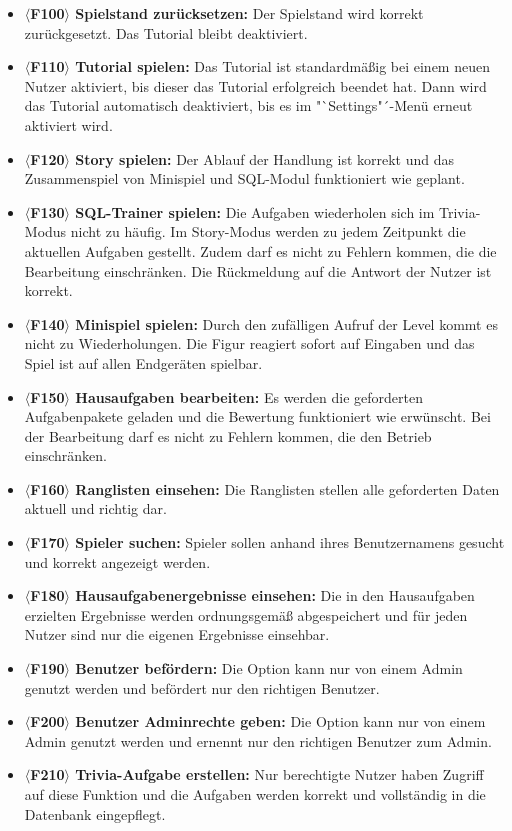 \begin{itemize}
\item \textbf{$\langle$F100$\rangle$ Spielstand zurücksetzen: }Der Spielstand wird korrekt zurückgesetzt. Das Tutorial bleibt deaktiviert.
\item \textbf{$\langle$F110$\rangle$ Tutorial spielen: }Das Tutorial ist standardmäßig bei einem neuen Nutzer aktiviert, bis dieser das Tutorial erfolgreich beendet hat. Dann wird das Tutorial automatisch deaktiviert,  bis es im "`Settings"´-Menü erneut aktiviert wird.
\item \textbf{$\langle$F120$\rangle$ Story spielen: }Der Ablauf der Handlung ist korrekt und das Zusammenspiel von Minispiel und SQL-Modul funktioniert wie geplant.
\item \textbf{$\langle$F130$\rangle$ SQL-Trainer spielen: }Die Aufgaben wiederholen sich im Trivia-Modus nicht zu häufig. Im Story-Modus werden zu jedem Zeitpunkt die aktuellen Aufgaben gestellt. Zudem darf es nicht zu Fehlern kommen, die die Bearbeitung einschränken. Die Rückmeldung auf die Antwort der Nutzer ist korrekt. 
\item \textbf{$\langle$F140$\rangle$ Minispiel spielen: }Durch den zufälligen Aufruf der Level kommt es nicht zu Wiederholungen. Die Figur reagiert sofort auf Eingaben und das Spiel ist auf allen Endgeräten spielbar.
\item \textbf{$\langle$F150$\rangle$ Hausaufgaben bearbeiten: }Es werden die geforderten Aufgabenpakete geladen und die Bewertung funktioniert wie erwünscht. Bei der Bearbeitung darf es nicht zu Fehlern kommen, die den Betrieb einschränken.
\item \textbf{$\langle$F160$\rangle$ Ranglisten einsehen: }Die Ranglisten stellen alle geforderten Daten aktuell und richtig dar.
\item \textbf{$\langle$F170$\rangle$ Spieler suchen: }Spieler sollen anhand ihres Benutzernamens gesucht und korrekt angezeigt werden.
\item \textbf{$\langle$F180$\rangle$ Hausaufgabenergebnisse einsehen: }Die in den Hausaufgaben erzielten Ergebnisse werden ordnungsgemäß abgespeichert und für jeden Nutzer sind nur die eigenen Ergebnisse einsehbar.
\item \textbf{$\langle$F190$\rangle$ Benutzer befördern: }Die Option kann nur von einem Admin genutzt werden und befördert nur den richtigen Benutzer.
\item \textbf{$\langle$F200$\rangle$ Benutzer Adminrechte geben: }Die Option kann nur von einem Admin genutzt werden und ernennt nur den richtigen Benutzer zum Admin.
\item \textbf{$\langle$F210$\rangle$ Trivia-Aufgabe erstellen: }Nur berechtigte Nutzer haben Zugriff auf diese Funktion und die Aufgaben werden korrekt und vollständig in die Datenbank eingepflegt.

\end{itemize}
